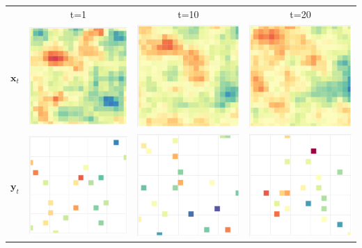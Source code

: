 \documentclass[usenames,dvipsnames,svgnames,table]{beamer}
\begin{document}
\begin{frame}

\begin{table}
	\begin{tabular}{cc|c|c}
		& t=1 & t=10 & t=20 \\
		$\textbf{x}_t$ & \includegraphics[width=0.28\linewidth]{Animations/animations/truth_5.pdf} & \includegraphics[width=0.28\linewidth]{Animations/animations/truth_15.pdf} & \includegraphics[width=0.28\linewidth]{Animations/animations/truth_25.pdf} \\ \pause
		$\textbf{y}_t$ & \includegraphics[width=0.28\linewidth]{Animations/animations/animate_5.pdf} & \includegraphics[width=0.28\linewidth]{Animations/animations/animate_15.pdf} & \includegraphics[width=0.28\linewidth]{Animations/animations/animate_25.pdf}

\end{tabular}
\end{table}
\end{frame}
\end{document}
